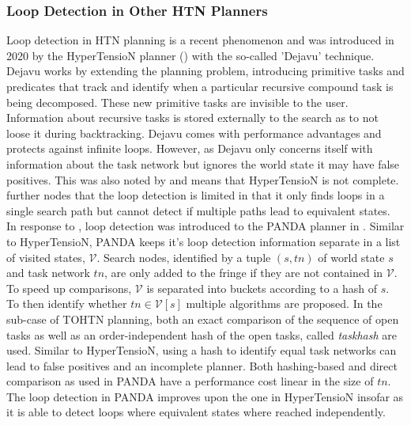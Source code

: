 \subsubsection{Loop Detection in Other HTN Planners}
\label{ld - history others}
Loop detection in HTN planning is a recent phenomenon and was introduced in 2020 by the HyperTensioN planner (\cite{magnaguagno2020hypertension}) with the so-called 'Dejavu' technique. Dejavu works by extending the planning problem, introducing primitive tasks and predicates that track and identify when a particular recursive compound task is being decomposed. These new primitive tasks are invisible to the user. Information about recursive tasks is stored externally to the search as to not loose it during backtracking. Dejavu comes with performance advantages and protects against infinite loops. However, as Dejavu only concerns itself with information about the task network but ignores the world state it may have false positives. This was also noted by \cite{holler2021loop} and means that HyperTensioN is not complete. \cite{holler2021loop} further nodes that the loop detection is limited in that it only finds loops in a single search path but cannot detect if multiple paths lead to equivalent states. \\
In response to \cite{magnaguagno2020hypertension}, loop detection was introduced to the PANDA planner in \cite{holler2021loop}. Similar to HyperTensioN, PANDA keeps it's loop detection information separate in a list of visited states, $\mathcal{V}$. Search nodes, identified by a tuple $(s, tn)$ of world state $s$ and task network $tn$, are only added to the fringe if they are not contained in $\mathcal{V}$. To speed up comparisons, $\mathcal{V}$ is separated into buckets according to a hash of $s$. To then identify whether $tn \in \mathcal{V}[s]$ multiple algorithms are proposed. In the sub-case of TOHTN planning, both an exact comparison of the sequence of open tasks as well as an order-independent hash of the open tasks, called \textit{taskhash} are used. Similar to HyperTensioN, using a hash to identify equal task networks can lead to false positives and an incomplete planner. Both hashing-based and direct comparison as used in PANDA have a performance cost linear in the size of $tn$. The loop detection in PANDA improves upon the one in HyperTensioN insofar as it is able to detect loops where equivalent states where reached independently.

